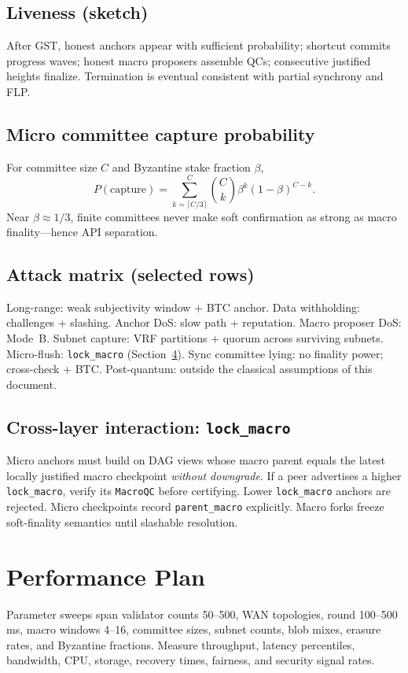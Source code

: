 \documentclass[11pt,a4paper,twoside]{report}
\theoremstyle{definition}
\begin{document}
\section{Liveness (sketch)}
After GST, honest anchors appear with sufficient probability; shortcut commits progress waves; honest macro proposers assemble QCs; consecutive justified heights finalize. Termination is eventual consistent with partial synchrony and FLP.

\section{Micro committee capture probability}
For committee size $C$ and Byzantine stake fraction $\beta$,
\begin{equation}
  P(\text{capture}) = \sum_{k=\lceil C/3\rceil}^{C} \binom{C}{k} \beta^k (1-\beta)^{C-k}.
\end{equation}
Near $\beta \approx 1/3$, finite committees never make soft confirmation as strong as macro finality---hence API separation.

\section{Attack matrix (selected rows)}
Long-range: weak subjectivity window + BTC anchor. Data withholding: challenges + slashing. Anchor DoS: slow path + reputation. Macro proposer DoS: Mode~B. Subnet capture: VRF partitions + quorum across surviving subnets. Micro-flush: \texttt{lock\_macro} (Section~\ref{sec:cross-layer}). Sync committee lying: no finality power; cross-check + BTC. Post-quantum: outside the classical assumptions of this document.

\section{Cross-layer interaction: \texttt{lock\_macro}}
\label{sec:cross-layer}
Micro anchors must build on DAG views whose macro parent equals the latest locally justified macro checkpoint \emph{without downgrade}. If a peer advertises a higher \texttt{lock\_macro}, verify its \texttt{MacroQC} before certifying. Lower \texttt{lock\_macro} anchors are rejected. Micro checkpoints record \texttt{parent\_macro} explicitly. Macro forks freeze soft-finality semantics until slashable resolution.

\chapter{Performance Plan}
Parameter sweeps span validator counts 50--500, WAN topologies, round 100--500\,ms, macro windows 4--16, committee sizes, subnet counts, blob mixes, erasure rates, and Byzantine fractions. Measure throughput, latency percentiles, bandwidth, CPU, storage, recovery times, fairness, and security signal rates.
\end{document}
